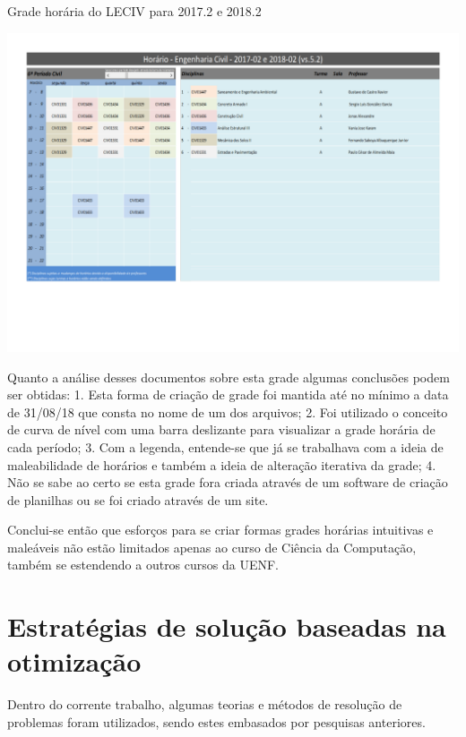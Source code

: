\begin{CenteredFigure} \caption{Grade horária do LECIV para 2017.2 e 2018.2} \label{fig:LECIV}
  \includegraphics[width=\textwidth]{files/img/2.02!2-marco/GradeHoráriaLECIV}
\end{CenteredFigure}

Quanto a análise desses documentos sobre esta grade algumas conclusões podem ser obtidas: 1. Esta forma de criação de grade foi mantida até no mínimo a data de 31/08/18 que consta no nome de um dos arquivos; 2. Foi utilizado o conceito de curva de nível com uma barra deslizante para visualizar a grade horária de cada período; 3. Com a legenda, entende-se que já se trabalhava com a ideia de maleabilidade de horários e também a ideia de alteração iterativa da grade; 4. Não se sabe ao certo se esta grade fora criada através de um software de criação de planilhas ou se foi criado através de um site.

Conclui-se então que esforços para se criar formas grades horárias intuitivas e maleáveis não estão limitados apenas ao curso de Ciência da Computação, também se estendendo a outros cursos da UENF.

\section{Estratégias de solução baseadas na otimização} \label{sec:teorias}                               %

Dentro do corrente trabalho, algumas teorias e métodos de resolução de problemas foram utilizados, sendo estes embasados por pesquisas anteriores.


